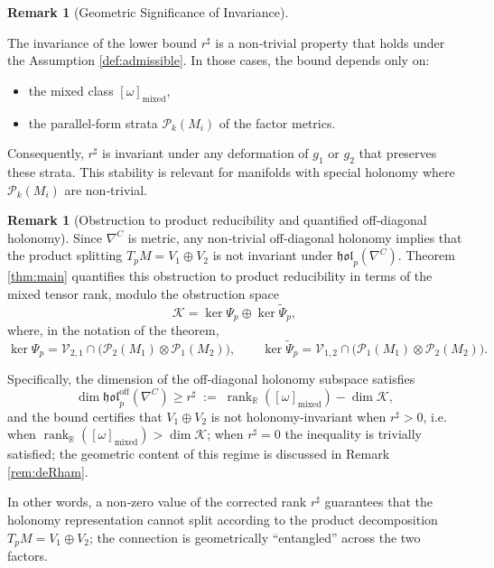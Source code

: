 \documentclass[11pt,reqno]{amsart}
\theoremstyle{plain}
\theoremstyle{definition}
\newtheorem{remark}[theorem]{Remark}
\numberwithin{equation}{section}
\begin{document}
\begin{remark}[Geometric Significance of Invariance]
\label{rmk:invariance}

The invariance of the lower bound $r^\sharp$ is a non‑trivial property that holds under the Assumption \ref{def:admissible}.  In those cases, the bound depends only on:
\begin{itemize}
    \item[(i)] the mixed class $[\omega]_{\mathrm{mixed}}$,
    \item[(ii)] the parallel‑form strata $\mathcal{P}_k(M_i)$ of the factor metrics.
\end{itemize}
Consequently, $r^\sharp$ is invariant under any deformation of $g_1$ or $g_2$ that 
preserves these strata.  This stability is relevant for manifolds with special holonomy 
where $\mathcal{P}_k(M_i)$ are non‑trivial.
\end{remark}


\begin{remark}[Obstruction to product reducibility and quantified off‑diagonal holonomy]
\label{rmk:forced-irred}
Since \(\nabla^{C}\) is metric, any non‑trivial off‑diagonal holonomy implies that the product splitting \(T_{p}M=V_1\oplus V_2\) is not invariant under \(\mathfrak{hol}_{p}(\nabla^{C})\).  
Theorem \ref{thm:main} quantifies this obstruction to product reducibility in terms of the mixed tensor rank, modulo the obstruction space
\[
\mathcal{K}=\ker\Psi_p\oplus\ker\widetilde{\Psi}_p,
\]
where, in the notation of the theorem,
\[
\ker\Psi_p=\mathcal{V}_{2,1}\cap\bigl(\mathcal P_2(M_1)\otimes \mathcal P_1(M_2)\bigr),\qquad
\ker\widetilde{\Psi}_p=\mathcal{V}_{1,2}\cap\bigl(\mathcal P_1(M_1)\otimes \mathcal P_2(M_2)\bigr).
\]

Specifically, the dimension of the off‑diagonal holonomy subspace satisfies
\[
\dim\mathfrak{hol}_{p}^{\operatorname{off}}(\nabla^{C})\geq 
r^\sharp\;:=\;\operatorname{rank}_{\mathbb{R}}([\omega]_{\mathrm{mixed}})-\dim\mathcal{K},
\]
and the bound certifies that $V_1\oplus V_2$ is not holonomy-invariant when $r^\sharp > 0$, i.e. when $\operatorname{rank}_\mathbb{R}([\omega]_{\mathrm{mixed}}) > \dim\mathcal{K}$; when $r^\sharp = 0$ the inequality is trivially satisfied; the geometric content of this regime is discussed in Remark \ref{rem:deRham}.

In other words, a non‑zero value of the corrected rank
\(r^{\sharp}\) guarantees that the holonomy representation cannot split according to the product decomposition \(T_pM=V_1\oplus V_2\); the connection is geometrically ``entangled'' across the two factors.
\end{remark}
\end{document}

